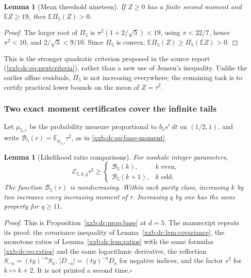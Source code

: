 \documentclass[11pt,a4paper]{article}
\numberwithin{equation}{section}
\newtheorem{lemma}[theorem]{Lemma}
\theoremstyle{definition}
\theoremstyle{remark}
\theoremstyle{plain}
\begin{document}
\begin{lemma}[Mean threshold nineteen]\label{xxb:d56:lem:jensen}
If $Z\ge0$ has a finite second moment and $\mathbb E Z\ge19$, then
$\mathbb E\Pi_5(Z)>0$.
\end{lemma}
\begin{proof}
The larger root of $\Pi_5$ is $\pi^2(1+2/\sqrt5)<19$, using $\pi<22/7$, hence
$\pi^2<10$, and $2/\sqrt5<9/10$. Since $\Pi_5$ is convex,
$\mathbb E\Pi_5(Z)\ge\Pi_5(\mathbb E Z)>0$.
\end{proof}
This is the stronger quadratic criterion proposed in the source report
(\eqref{xxb:dc:eq:nextcriteria}), rather than a new use of Jensen's
inequality. Unlike the earlier affine residuals, $\Pi_5$ is not increasing
everywhere; the remaining task is to certify practical lower bounds on the
mean of $Z=\tau^2$.

\subsubsection{Two exact moment certificates cover the infinite tails}

Let $\mu_{5,r}$ be the probability measure proportional to $b_5s^r\,dt$ on
$(1/2,1)$, and write $\mathcal B_5(r)=\mathbb E_{\mu_{5,r}}\tau^2$, as in
\eqref{xxb:dc:eq:base-moment}.

\begin{lemma}[Likelihood ratio comparisons]\label{xxb:d56:lem:compare}
For nonhole integer parameters,
\[
 \mathcal E_{5,k,q}\tau^2\ge
 \begin{cases}\mathcal B_5(k),&k\text{ even},\\\mathcal B_5(k+1),&k\text{ odd}.
 \end{cases}
\]
The function $\mathcal B_5(r)$ is nondecreasing. Within each parity class,
increasing $k$ by two increases every increasing moment of $\tau$. Increasing
$q$ by one has the same property for $q\ge11$.
\end{lemma}
\emph{Proof.}  This is Proposition~\ref{xxb:dc:prop:base} at $d=5$.  The
manuscript repeats its proof: the covariance inequality of
Lemma~\ref{xxb:dc:lem:covariance}, the monotone ratios of
Lemma~\ref{xxb:dc:lem:ratios} with the same formulas \eqref{xxb:dc:eq:ratios}
and the same logarithmic derivative, the reflection
$S_{-a}=(ty)^{-a}S_a$, $|D_{-a}|=(ty)^{-a}D_a$ for negative indices, and the
factor $s^2$ for $k\mapsto k+2$.  It is not printed a second
time.\hfill$\square$
\end{document}

